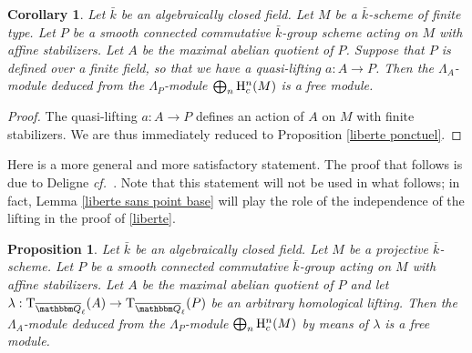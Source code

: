 \documentclass[12pt,english]{smfart}
\numberwithin{equation}{subsection}
\newtheorem{proposition}[equation]{Proposition}
\newtheorem{corollary}[equation]{Corollary}
\theoremstyle{remark}
\newcommand\rmT{{\rm T}}
\newcommand\QQ{{\mathbbm Q}}
\newcommand\rmH{{\rm H}}
\newcommand\cf{{\it cf.\ }}
\newcommand\Ql{{\overline\QQ_\ell}}
\begin{document}
\begin{corollary}\label{liberte quasi-relevement}
Let $\bar k$ be an algebraically closed field. Let $M$ be a $\bar k$-scheme of finite type. Let $P$ be a smooth connected commutative $\bar k$-group scheme acting on $M$ with affine stabilizers. Let $A$ be the maximal abelian quotient of $P$. Suppose that $P$ is defined over a finite field, so that we have a quasi-lifting $a:A\rightarrow P$. Then the $\Lambda_A$-module deduced from the $\Lambda_P$-module $\bigoplus_n \rmH^n_c(M)$ is a free module.
\end{corollary}

\begin{proof}
The quasi-lifting $a:A\rightarrow P$ defines an action of $A$ on $M$ with finite stabilizers. We are thus immediately reduced to Proposition \ref{liberte ponctuel}.
\end{proof}

Here is a more general and more satisfactory statement. The proof that follows is due to Deligne \cf \cite{Deligne lettre}. Note that this statement will not be used in what follows; in fact, Lemma \ref{liberte sans point base} will play the role of the independence of the lifting in the proof of \ref{liberte}.

\begin{proposition}\label{liberte relevement arbitraire}
Let $\bar k$ be an algebraically closed field. Let $M$ be a projective $\bar k$-scheme. Let $P$ be a smooth connected commutative $\bar k$-group acting on $M$ with affine stabilizers. Let $A$ be the maximal abelian quotient of $P$ and let $\lambda:\rmT_\Ql(A)\rightarrow \rmT_\Ql(P)$ be an arbitrary homological lifting. Then the $\Lambda_A$-module deduced from the $\Lambda_P$-module $\bigoplus_n \rmH^n_c(M)$ by means of $\lambda$ is a free module.
\end{proposition}
\end{document}
